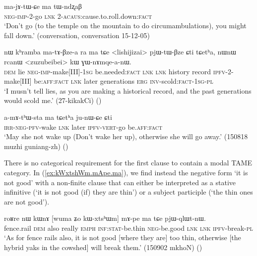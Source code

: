 \begin{exe}
\ex \label{ex:ma.tWndzxaB}
\gll  ma-jɤ-tɯ-ɕe ma tɯ-ndʐaβ \\
\textsc{neg}-\textsc{imp}-2-go \textsc{lnk} 2-\textsc{acaus}:cause.to.roll.down:\textsc{fact} \\
\glt `Don't go (to the temple on the mountain to do circumambulations), you might fall down.' (conversation, conversation 15-12-05)
\end{exe}

\begin{exe}
\ex \label{ex:matABzea}
\gll nɯ kʰramba ma-tɤ-βze-a ra ma tɕe <lishijizai> pjɯ-tɯ-βze ɕti tɕetʰa, nɯnɯ rcanɯ <zuzubeibei> kɯ ɣɯ-nɤmqe-a-nɯ.  \\
\textsc{dem}  lie \textsc{neg}-\textsc{imp}-make[III]-\textsc{1sg} be.needed:\textsc{fact} \textsc{lnk} \textsc{lnk}   history record \textsc{ipfv}-2-make[III] be:\textsc{aff}:\textsc{fact} \textsc{lnk} later generations \textsc{erg}  \textsc{inv}-scold:\textsc{fact}-\textsc{1sg}-\textsc{pl} \\
\glt `I musn't tell lies, as you are making a historical record, and the past generations would scold me.'  (27-kikakCi)
()
 \end{exe}

\begin{exe}
\ex \label{ex:ma.tCetha.junWCe}
\gll a-mɤ-tʰɯ-sta ma tɕetʰa ju-nɯ-ɕe ɕti \\
\textsc{irr}-\textsc{neg}-\textsc{pfv}-wake \textsc{lnk} later \textsc{ipfv}-\textsc{vert}-go be.\textsc{aff}:\textsc{fact} \\
\glt `May she not wake up (Don't wake her up), otherwise she will go away.' (150818 muzhi guniang-zh)
()
\end{exe}  

There is no categorical requirement for the first clause to contain a modal TAME category. In (\ref{ex:kWxtshWm.mApe.ma}), we find instead the negative form  `it is not good' with a non-finite clause that can either be interpreted as a stative infinitive (`it is not good (if) they are thin') or a subject participle (`the thin ones are not good').

\begin{exe}
\ex \label{ex:kWxtshWm.mApe.ma}
\gll roʁre nɯ kɯnɤ [wuma ʑo kɯ-xtsʰɯm] mɤ-pe ma tɕe pjɯ-qlɯt-nɯ. \\
fence.rail \textsc{dem} also really \textsc{emph} \textsc{inf}:\textsc{stat}-be.thin \textsc{neg}-be.good \textsc{lnk} \textsc{lnk} \textsc{ipfv}-break-\textsc{pl} \\
\glt `As for fence rails also, it is not good [where they are] too thin, otherwise [the hybrid yaks in the cowshed] will break them.' (150902 mkhoN)
()
\end{exe}  

